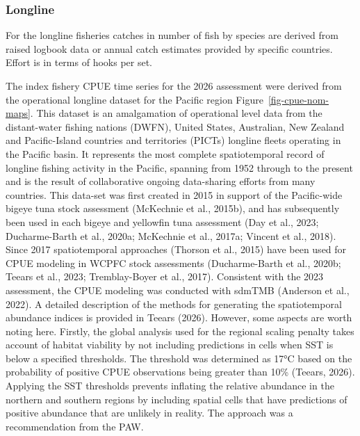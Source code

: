 \documentclass[
  english,
  a4paper,
  a4paper,
  11pt]{SCreport}
\begin{document}
\subsubsection{Longline}\label{sec-catch-effort-LL}

For the longline fisheries catches in number of fish by species are
derived from raised logbook data or annual catch estimates provided by
specific countries. Effort is in terms of hooks per set.

The index fishery CPUE time series for the 2026 assessment were derived
from the operational longline dataset for the Pacific region
Figure~\ref{fig-cpue-nom-maps}. This dataset is an amalgamation of
operational level data from the distant-water fishing nations (DWFN),
United States, Australian, New Zealand and Pacific-Island countries and
territories (PICTs) longline fleets operating in the Pacific basin. It
represents the most complete spatiotemporal record of longline fishing
activity in the Pacific, spanning from 1952 through to the present and
is the result of collaborative ongoing data-sharing efforts from many
countries. This data-set was first created in 2015 in support of the
Pacific-wide bigeye tuna stock assessment (McKechnie et al., 2015b), and
has subsequently been used in each bigeye and yellowfin tuna assessment
(Day et al., 2023; Ducharme-Barth et al., 2020a; McKechnie et al.,
2017a; Vincent et al., 2018). Since 2017 spatiotemporal approaches
(Thorson et al., 2015) have been used for CPUE modeling in WCPFC stock
assessments (Ducharme-Barth et al., 2020b; Teears et al., 2023;
Tremblay-Boyer et al., 2017). Consistent with the 2023 assessment, the
CPUE modeling was conducted with sdmTMB (Anderson et al., 2022). A
detailed description of the methods for generating the spatiotemporal
abundance indices is provided in Teears (2026). However, some aspects
are worth noting here. Firstly, the global analysis used for the
regional scaling penalty takes account of habitat viability by not
including predictions in cells when SST is below a specified thresholds.
The threshold was determined as 17°C based on the probability of
positive CPUE observations being greater than 10\% (Teears, 2026).
Applying the SST thresholds prevents inflating the relative abundance in
the northern and southern regions by including spatial cells that have
predictions of positive abundance that are unlikely in reality. The
approach was a recommendation from the PAW.
\end{document}
